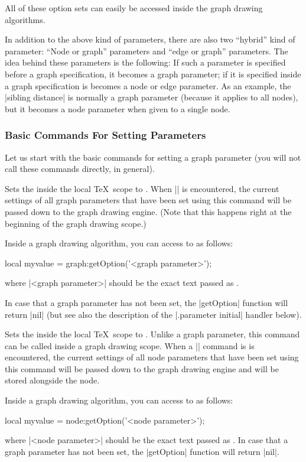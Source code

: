 All of these option sets can easily be accessed inside the graph 
drawing algorithms.


In addition to the above kind of parameters, there are also two
``hybrid'' kind of parameter: ``Node or graph'' parameters and ``edge
or graph'' parameters. The idea behind these parameters is the
following: If such a parameter is specified before a graph
specification, it becomes a graph parameter; if it is specified inside
a graph specification is becomes a node or edge parameter. As an
example, the |sibling distance| is normally a graph parameter (because
it applies to all nodes), but it becomes a node parameter when given
to a single node.


\subsubsection{Basic Commands For Setting Parameters}

Let us start with the basic commands for setting a graph parameter
(you will not call these commands directly, in general).

\begin{command}{\pgfgdgraphparameter{}} 
  Sets the  inside the local \TeX\ scope to
  . When |\pgfgdbeginscope| is encountered,
  the current settings of all graph parameters that have been set
  using this command will be passed down to the graph drawing
  engine. (Note that this happens right at the beginning of the graph
  drawing scope.)

  Inside a graph drawing algorithm, you can access to  as
  follows:
\begin{codeexample}
  local myvalue = graph:getOption('<graph parameter>');
\end{codeexample}
  where |<graph parameter>| should be the exact text passed as
  .

  In case that a graph parameter has not been set, the |getOption|
  function will return |nil| (but see also the description of the
  |.parameter initial| handler below).
\end{command}


\begin{command}{\pgfgdnodeparameter{}} 
  Sets the  inside the local \TeX\ scope to
  . Unlike a graph parameter, this command can 
  be called inside a graph drawing scope. When a |\pgfnode| command is
  is encountered, the current settings of all node parameters that
  have been set using this command will be passed down to the graph
  drawing engine and will be stored alongside the node.

  Inside a graph drawing algorithm, you can access to  as
  follows:
\begin{codeexample}
  local myvalue = node:getOption('<node parameter>');
\end{codeexample}
  where |<node parameter>| should be the exact text passed as
  . In case that a graph parameter has not been
  set, the |getOption| function will return |nil|.
\end{command}

